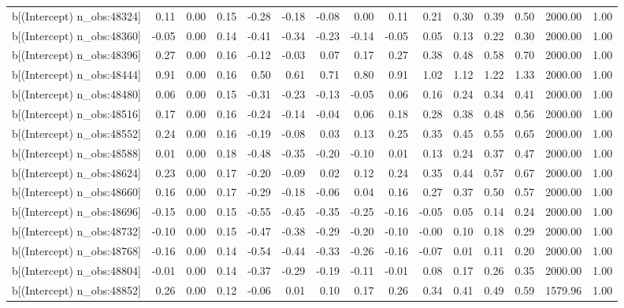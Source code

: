 \begin{table}[ht]
\begin{tabular}{rrrrrrrrrrrrrrr}
  b[(Intercept) n\_obs:48324] & 0.11 & 0.00 & 0.15 & -0.28 & -0.18 & -0.08 & 0.00 & 0.11 & 0.21 & 0.30 & 0.39 & 0.50 & 2000.00 & 1.00 \\ 
  b[(Intercept) n\_obs:48360] & -0.05 & 0.00 & 0.14 & -0.41 & -0.34 & -0.23 & -0.14 & -0.05 & 0.05 & 0.13 & 0.22 & 0.30 & 2000.00 & 1.00 \\ 
  b[(Intercept) n\_obs:48396] & 0.27 & 0.00 & 0.16 & -0.12 & -0.03 & 0.07 & 0.17 & 0.27 & 0.38 & 0.48 & 0.58 & 0.70 & 2000.00 & 1.00 \\ 
  b[(Intercept) n\_obs:48444] & 0.91 & 0.00 & 0.16 & 0.50 & 0.61 & 0.71 & 0.80 & 0.91 & 1.02 & 1.12 & 1.22 & 1.33 & 2000.00 & 1.00 \\ 
  b[(Intercept) n\_obs:48480] & 0.06 & 0.00 & 0.15 & -0.31 & -0.23 & -0.13 & -0.05 & 0.06 & 0.16 & 0.24 & 0.34 & 0.41 & 2000.00 & 1.00 \\ 
  b[(Intercept) n\_obs:48516] & 0.17 & 0.00 & 0.16 & -0.24 & -0.14 & -0.04 & 0.06 & 0.18 & 0.28 & 0.38 & 0.48 & 0.56 & 2000.00 & 1.00 \\ 
  b[(Intercept) n\_obs:48552] & 0.24 & 0.00 & 0.16 & -0.19 & -0.08 & 0.03 & 0.13 & 0.25 & 0.35 & 0.45 & 0.55 & 0.65 & 2000.00 & 1.00 \\ 
  b[(Intercept) n\_obs:48588] & 0.01 & 0.00 & 0.18 & -0.48 & -0.35 & -0.20 & -0.10 & 0.01 & 0.13 & 0.24 & 0.37 & 0.47 & 2000.00 & 1.00 \\ 
  b[(Intercept) n\_obs:48624] & 0.23 & 0.00 & 0.17 & -0.20 & -0.09 & 0.02 & 0.12 & 0.24 & 0.35 & 0.44 & 0.57 & 0.67 & 2000.00 & 1.00 \\ 
  b[(Intercept) n\_obs:48660] & 0.16 & 0.00 & 0.17 & -0.29 & -0.18 & -0.06 & 0.04 & 0.16 & 0.27 & 0.37 & 0.50 & 0.57 & 2000.00 & 1.00 \\ 
  b[(Intercept) n\_obs:48696] & -0.15 & 0.00 & 0.15 & -0.55 & -0.45 & -0.35 & -0.25 & -0.16 & -0.05 & 0.05 & 0.14 & 0.24 & 2000.00 & 1.00 \\ 
  b[(Intercept) n\_obs:48732] & -0.10 & 0.00 & 0.15 & -0.47 & -0.38 & -0.29 & -0.20 & -0.10 & -0.00 & 0.10 & 0.18 & 0.29 & 2000.00 & 1.00 \\ 
  b[(Intercept) n\_obs:48768] & -0.16 & 0.00 & 0.14 & -0.54 & -0.44 & -0.33 & -0.26 & -0.16 & -0.07 & 0.01 & 0.11 & 0.20 & 2000.00 & 1.00 \\ 
  b[(Intercept) n\_obs:48804] & -0.01 & 0.00 & 0.14 & -0.37 & -0.29 & -0.19 & -0.11 & -0.01 & 0.08 & 0.17 & 0.26 & 0.35 & 2000.00 & 1.00 \\ 
  b[(Intercept) n\_obs:48852] & 0.26 & 0.00 & 0.12 & -0.06 & 0.01 & 0.10 & 0.17 & 0.26 & 0.34 & 0.41 & 0.49 & 0.59 & 1579.96 & 1.00 \\ 

\end{tabular}
\end{table}
